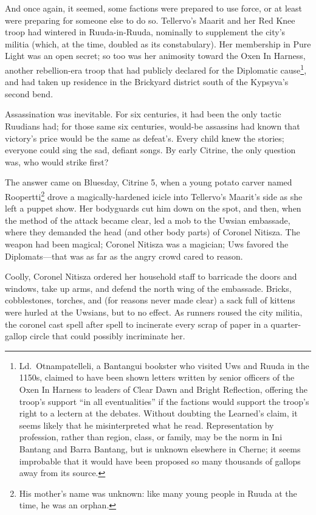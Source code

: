 \documentclass[12pt]{report}
\begin{document}
And once again, it seemed, some factions were prepared to use force,
or at least were preparing for someone else to do so.  Tellervo's
Maarit and her Red Knee troop had wintered in Ruuda-in-Ruuda,
nominally to supplement the city's militia (which, at the time,
doubled as its constabulary).  Her membership in Pure Light was an
open secret; so too was her animosity toward the Oxen In Harness,
another rebellion-era troop that had publicly declared for the
Diplomatic cause\footnote{Ld.\ Otnampatelleli, a Bantangui bookster
who visited Uws and Ruuda in the 1150s, claimed to have been shown
letters written by senior officers of the Oxen In Harness to leaders
of Clear Dawn and Bright Reflection, offering the troop's support ``in
all eventualities'' if the factions would support the troop's right to
a lectern at the debates.  Without doubting the Learned's claim, it
seems likely that he misinterpreted what he read.  Representation by
profession, rather than region, class, or family, may be the norm in
Ini Bantang and Barra Bantang, but is unknown elsewhere in Cherne; it
seems improbable that it would have been proposed so many thousands of
gallops away from its source.}, and had taken up residence in the
Brickyard district south of the Kypsyva's second bend.

Assassination was inevitable.  For six centuries, it had been the only
tactic Ruudians had; for those same six centuries, would-be assassins
had known that victory's price would be the same as defeat's.  Every
child knew the stories; everyone could sing the sad, defiant {\aemott}
songs.  By early Citrine, the only question was, who would strike
first?

The answer came on Bluesday, Citrine 5, when a young potato carver
named Roopertti\footnote{His mother's name was unknown: like many
young people in Ruuda at the time, he was an orphan.} drove a
magically-hardened icicle into Tellervo's Maarit's side as she left a
puppet show.  Her bodyguards cut him down on the spot, and then, when
the method of the attack became clear, led a mob to the Uwsian
embassade, where they demanded the head (and other body parts) of
Coronel Nitisza.  The weapon had been magical; Coronel Nitisza was a
magician; Uws favored the Diplomats---that was as far as the angry
crowd cared to reason.

Coolly, Coronel Nitisza ordered her household staff to barricade the
doors and windows, take up arms, and defend the north wing of the
embassade.  Bricks, cobblestones, torches, and (for reasons never made
clear) a sack full of kittens were hurled at the Uwsians, but to no
effect.  As runners roused the city militia, the coronel cast spell
after spell to incinerate every scrap of paper in a quarter-gallop
circle that could possibly incriminate her.
\end{document}
